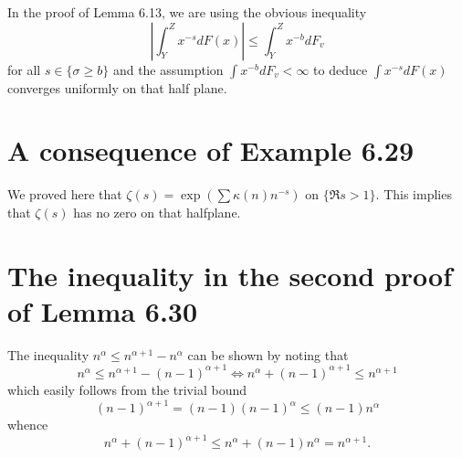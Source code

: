 \documentclass[12pt]{article}
\newcommand{\Abs}[1]{\left| #1 \right|}
\begin{document}
In the proof of Lemma 6.13, we are using the obvious inequality
$$\Abs{ \int_Y^Z x^{-s} dF(x) } \leq \int_Y^Z x^{-b} dF_v$$
for all $s \in \{\sigma \geq b\}$ and the assumption $\int x^{-b} dF_v < \infty$ to deduce $\int x^{-s} dF(x)$ converges uniformly on that half plane.

\section{A consequence of Example 6.29}

We proved here that $\zeta(s) = \exp\left(\sum \kappa(n) n^{-s}\right)$ on $\{\Re s > 1\}$. This implies that $\zeta(s)$ has no zero on that halfplane.

\section{The inequality in the second proof of Lemma 6.30}

The inequality $n^\alpha \leq n^{\alpha + 1} - n^{\alpha}$ can be shown by noting that
$$n^\alpha \leq n^{\alpha + 1} - (n - 1)^{\alpha + 1} \iff n^\alpha + (n-1)^{\alpha + 1} \leq n^{\alpha + 1}$$
which easily follows from the trivial bound
$$(n-1)^{\alpha + 1} = (n-1) (n-1)^{\alpha} \leq (n-1) n^{\alpha}$$
whence
$$n^\alpha + (n-1)^{\alpha + 1} \leq n^{\alpha} + (n-1) n^{\alpha} = n^{\alpha + 1}.$$

\unless\ifdefined\IsMainDocument
\end{document}
